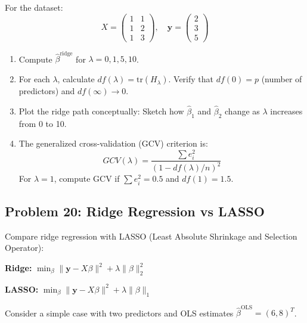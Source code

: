 \documentclass[12pt]{article}
\begin{document}
For the dataset:
\[
X = \begin{pmatrix} 1 & 1 \\ 1 & 2 \\ 1 & 3 \end{pmatrix}, \quad \mathbf{y} = \begin{pmatrix} 2 \\ 3 \\ 5 \end{pmatrix}
\]

\begin{enumerate}[label=(\alph*)]
\item Compute \(\hat{\beta}^{\text{ridge}}\) for \(\lambda = 0, 1, 5, 10\).

\item For each \(\lambda\), calculate \(df(\lambda) = \text{tr}(H_\lambda)\). Verify that \(df(0) = p\) (number of predictors) and \(df(\infty) \to 0\).

\item Plot the ridge path conceptually: Sketch how \(\hat{\beta}_1\) and \(\hat{\beta}_2\) change as \(\lambda\) increases from 0 to 10.

\item The generalized cross-validation (GCV) criterion is:
\[
GCV(\lambda) = \frac{\sum e_i^2}{(1 - df(\lambda)/n)^2}
\]
For \(\lambda = 1\), compute GCV if \(\sum e_i^2 = 0.5\) and \(df(1) = 1.5\).
\end{enumerate}

\subsection*{Problem 20: Ridge Regression vs LASSO}

Compare ridge regression with LASSO (Least Absolute Shrinkage and Selection Operator):

\textbf{Ridge:} \(\min_\beta \|\mathbf{y} - X\beta\|^2 + \lambda\|\beta\|_2^2\)

\textbf{LASSO:} \(\min_\beta \|\mathbf{y} - X\beta\|^2 + \lambda\|\beta\|_1\)

Consider a simple case with two predictors and OLS estimates \(\hat{\beta}^{\text{OLS}} = (6, 8)^T\).
\end{document}
